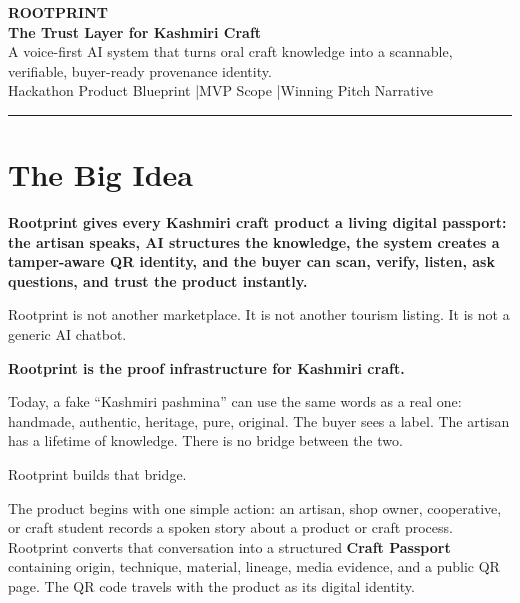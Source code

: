 \documentclass[11pt,a4paper]{article}
\newcommand{\tagline}[1]{\begin{center}{\Large\bfseries\color{ink}#1}\end{center}}
\begin{document}

\begin{center}
  {\fontsize{28}{32}\selectfont\bfseries\color{ink}ROOTPRINT}\\[3pt]
  {\Large\bfseries\color{saffron}The Trust Layer for Kashmiri Craft}\\[5pt]
  {\normalsize\color{slate}A voice-first AI system that turns oral craft knowledge into a scannable, verifiable, buyer-ready provenance identity.}\\[8pt]
  {\small\color{slate}Hackathon Product Blueprint \quad|\quad MVP Scope \quad|\quad Winning Pitch Narrative}
\end{center}

\vspace{0.35em}
\noindent\color{saffron}\rule{\linewidth}{2pt}
\vspace{0.75em}

\section{The Big Idea}

\begin{blackbox}
\textbf{Rootprint gives every Kashmiri craft product a living digital passport: the artisan speaks, AI structures the knowledge, the system creates a tamper-aware QR identity, and the buyer can scan, verify, listen, ask questions, and trust the product instantly.}
\end{blackbox}

Rootprint is not another marketplace. It is not another tourism listing. It is not a generic AI chatbot.

\tagline{Rootprint is the proof infrastructure for Kashmiri craft.}

Today, a fake ``Kashmiri pashmina'' can use the same words as a real one: handmade, authentic, heritage, pure, original. The buyer sees a label. The artisan has a lifetime of knowledge. There is no bridge between the two.

Rootprint builds that bridge.

The product begins with one simple action: an artisan, shop owner, cooperative, or craft student records a spoken story about a product or craft process. Rootprint converts that conversation into a structured \textbf{Craft Passport} containing origin, technique, material, lineage, media evidence, and a public QR page. The QR code travels with the product as its digital identity.
\end{document}
